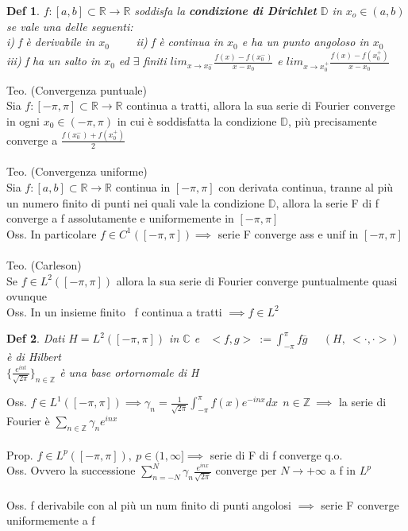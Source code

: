 \documentclass{article}
\theoremstyle{unnumbered}
\newtheorem* {theoremT}{Def}
\theoremstyle{unnumbered1}
\newenvironment{defi}{\begin{gBox}\begin{theoremT}}{\end{theoremT}\end{gBox}}
\begin{document}
\begin{defi}
$f:[a,b]\subset\mathbb{R}\to\mathbb{R}$ soddisfa la \textbf{condizione di Dirichlet} $\mathbb{D}$ in $x_o\in(a,b)$ se vale una delle seguenti:\\
i) f è derivabile in $x_0$  \ \ \ \ ii) f è continua in $x_0$ e ha un punto angoloso in $x_0$ \\ iii) f ha un salto in $x_0$ ed $\exists$ finiti $lim_{x\to x_0^-} \frac{f(x)-f(x_0^-)}{x-x_0}$ e $lim_{x\to x_0^+} \frac{f(x)-f(x_0^+)}{x-x_0}$
\end{defi}
%
%
Teo. (Convergenza puntuale)\\
Sia $f:[-\pi,\pi]\subset\mathbb{R}\to\mathbb{R}$ continua a tratti, allora la sua serie di Fourier converge in ogni $x_0\in(-\pi,\pi)$ in cui è soddisfatta la condizione $\mathbb{D}$, più precisamente converge a $\frac{f(x_0^-)+f(x_0^+)}2$\\ \\
%
%
Teo. (Convergenza uniforme)\\
Sia $f:[a,b]\subset\mathbb{R}\to\mathbb{R}$ continua in $[-\pi,\pi]$ con derivata continua, tranne al più un numero finito di punti nei quali vale la condizione $\mathbb{D}$, allora la serie F di f converge a f assolutamente e uniformemente in $[-\pi,\pi]$\\
Oss. In particolare $f\in C^1([-\pi,\pi]) \implies$ serie F converge ass e unif in $[-\pi,\pi]$\\ \\
%
%
Teo. (Carleson)\\
Se $f\in L^2([-\pi,\pi])$ allora la sua serie di Fourier converge puntualmente quasi ovunque\\
%
Oss. In un insieme finito \ f continua a tratti $\implies f \in L^2$\\


\begin{defi}
Dati $H=L^2([-\pi,\pi])$ in $\mathbb{C}$ e \ $<f,g>\ :=\int_{-\pi}^{\pi}f\overline{g}$ \ \ $(H,\ <\cdot,\cdot>)$ è di Hilbert \\ $\{\frac{e^{int}}{\sqrt{2\pi}}\}_{n\in\mathbb{Z}}$ è una base ortornomale di H
\end{defi}
%
Oss. $f\in L^1([-\pi,\pi]) \implies \gamma_n=\frac{1}{\sqrt{2\pi}}\int_{-\pi}^{\pi}f(x)e^{-inx}dx \ \ n\in\mathbb{Z} \ \implies$ la serie di Fourier è $\sum_{n\in\mathbb{Z}}\gamma_n e^{inx}$\\ \\
%
Prop. $f\in L^p([-\pi,\pi]), \ p\in (1,\infty] \implies$ serie di F di f converge q.o.\\
Oss. Ovvero la successione $\sum_{n=-N}^N \gamma_n \frac{e^{inx}}{\sqrt{2\pi}}$ converge per $N\to +\infty$ a f in $L^p$\\ \\
%
%
Oss. f derivabile con al più un num finito di punti angolosi $\implies$ serie F converge uniformemente a f\\
\end{document}
